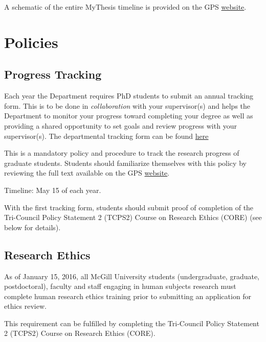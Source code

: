 \documentclass[
  letterpaper,
  DIV=11,
  numbers=noendperiod]{scrreprt}
\begin{document}
A schematic of the entire MyThesis timeline is provided on the GPS
\href{https://www.mcgill.ca/gps/files/gps/mcgill_mythesis_overview_of_process.pdf}{website}.


\chapter{Policies}\label{policies}

\section{Progress Tracking}\label{progress-tracking}

Each year the Department requires PhD students to submit an annual
tracking form. This is to be done in \emph{collaboration} with your
supervisor(s) and helps the Department to monitor your progress toward
completing your degree as well as providing a shared opportunity to set
goals and review progress with your supervisor(s). The departmental
tracking form can be found
\href{https://www.mcgill.ca/epi-biostat-occh/files/epi-biostat-occh/gps_gradstudent_progress_tracking_report_2020.pdf}{here}

This is a mandatory policy and procedure to track the research progress
of graduate students. Students should familiarize themselves with this
policy by reviewing the full text available on the GPS
\href{https://www.mcgill.ca/gps/students/progress-tracking}{website}.

Timeline: May 15 of each year.

With the first tracking form, students should submit proof of completion
of the Tri-Council Policy Statement 2 (TCPS2) Course on Research Ethics
(CORE) (see below for details).

\section{Research Ethics}\label{research-ethics}

As of January 15, 2016, all McGill University students (undergraduate,
graduate, postdoctoral), faculty and staff engaging in human subjects
research must complete human research ethics training prior to
submitting an application for ethics review.

This requirement can be fulfilled by completing the Tri-Council Policy
Statement 2 (TCPS2) Course on Research Ethics (CORE).
\end{document}
